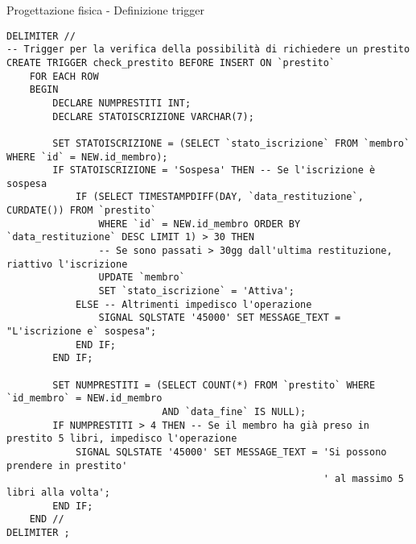 \begin{frame}[fragile]{Progettazione fisica - Definizione trigger}
    \begin{verbatim}
DELIMITER //
-- Trigger per la verifica della possibilità di richiedere un prestito
CREATE TRIGGER check_prestito BEFORE INSERT ON `prestito`
    FOR EACH ROW
    BEGIN
        DECLARE NUMPRESTITI INT;
        DECLARE STATOISCRIZIONE VARCHAR(7);

        SET STATOISCRIZIONE = (SELECT `stato_iscrizione` FROM `membro` WHERE `id` = NEW.id_membro);
        IF STATOISCRIZIONE = 'Sospesa' THEN -- Se l'iscrizione è sospesa
            IF (SELECT TIMESTAMPDIFF(DAY, `data_restituzione`, CURDATE()) FROM `prestito`
                WHERE `id` = NEW.id_membro ORDER BY `data_restituzione` DESC LIMIT 1) > 30 THEN
                -- Se sono passati > 30gg dall'ultima restituzione, riattivo l'iscrizione
                UPDATE `membro`
                SET `stato_iscrizione` = 'Attiva';
            ELSE -- Altrimenti impedisco l'operazione
                SIGNAL SQLSTATE '45000' SET MESSAGE_TEXT = "L'iscrizione e` sospesa";
            END IF;
        END IF;
        
        SET NUMPRESTITI = (SELECT COUNT(*) FROM `prestito` WHERE `id_membro` = NEW.id_membro
                           AND `data_fine` IS NULL);
        IF NUMPRESTITI > 4 THEN -- Se il membro ha già preso in prestito 5 libri, impedisco l'operazione
            SIGNAL SQLSTATE '45000' SET MESSAGE_TEXT = 'Si possono prendere in prestito'
                                                       ' al massimo 5 libri alla volta';
        END IF;
    END //
DELIMITER ;
    \end{verbatim}
\end{frame}


